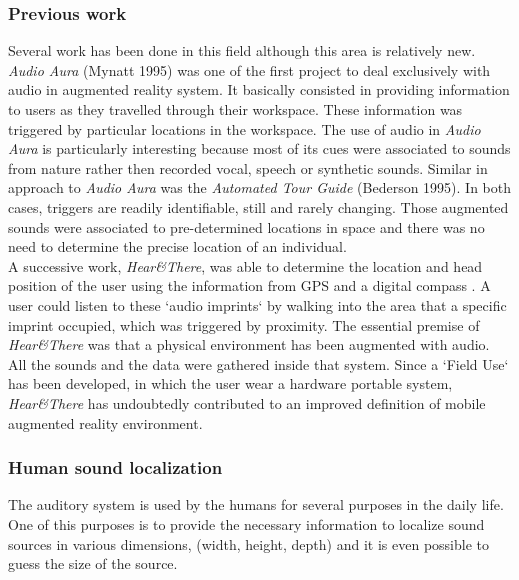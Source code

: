 \documentclass[journal]{IEEEtran}
\begin{document}
\subsubsection{Previous work}
Several work has been done in this field although this area is relatively new. \emph{Audio Aura} (Mynatt 1995) was one of the first project to deal exclusively with audio in augmented reality system. It basically consisted in providing information to users as they travelled through their workspace. These information was triggered by particular locations in the workspace. The use of audio in \emph{Audio Aura} is particularly interesting because most of its cues were associated to sounds from nature rather then recorded vocal, speech or synthetic sounds. Similar in approach to \emph{Audio Aura} was the \emph{Automated Tour Guide} (Bederson 1995). In both cases, triggers are readily identifiable, still and rarely changing. Those augmented sounds were associated to pre-determined locations in space and there was no need to determine the precise location of an individual. \\
A successive work, \emph{Hear\&There}, was able to determine the location and head position of the user using the information from GPS and a digital compass \cite{}. A user could listen to these `audio imprints` by walking into the area that a specific imprint occupied, which was triggered by proximity. The essential premise of  \emph{Hear\&There} was that a physical environment has been augmented with audio. All the sounds and the data were gathered inside that system. Since a `Field Use` has been developed, in which the user wear a hardware portable system, \emph{Hear\&There} has undoubtedly contributed to an improved definition of mobile augmented reality environment.

\subsubsection{Human sound localization}
The auditory system is used by the humans for several purposes in the daily life. One of this purposes is to provide the necessary information to localize sound sources in various dimensions, (width, height, depth) and it is even possible to guess the size of the source.\\
\end{document}
